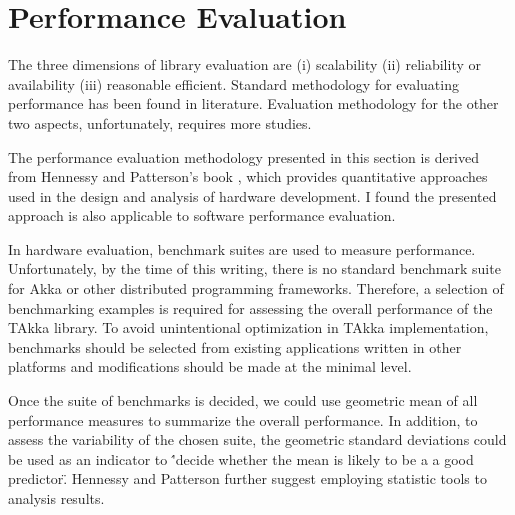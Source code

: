 \section{Performance Evaluation}

The three dimensions of library evaluation are (i) scalability (ii) reliability or availability (iii) reasonable efficient.  Standard methodology for evaluating performance has been found in literature.  Evaluation methodology for the other two aspects, unfortunately, requires more studies.

The performance evaluation methodology presented in this section is derived from Hennessy and Patterson\rq{}s book \cite{HePa06}, which provides quantitative approaches used in the design and analysis of hardware development.  I found the presented approach is also applicable to software performance evaluation.

In hardware evaluation, benchmark suites are used to measure performance.  Unfortunately, by the time of this writing, there is no standard benchmark suite for Akka or other distributed programming frameworks.  Therefore, a selection of benchmarking examples is required for assessing the overall performance of the TAkka library.  To avoid unintentional optimization in TAkka implementation, benchmarks should be selected from existing applications written in other platforms and modifications should be made at the minimal level.

Once the suite of benchmarks is decided, we could use geometric mean of all performance measures to summarize the overall performance.  In addition, to assess the variability of the chosen suite, the geometric standard deviations could be used as an indicator to \''decide whether the mean is likely to be a a good predictor\".  Hennessy and Patterson\cite{HePa06} further suggest employing statistic tools to analysis results.